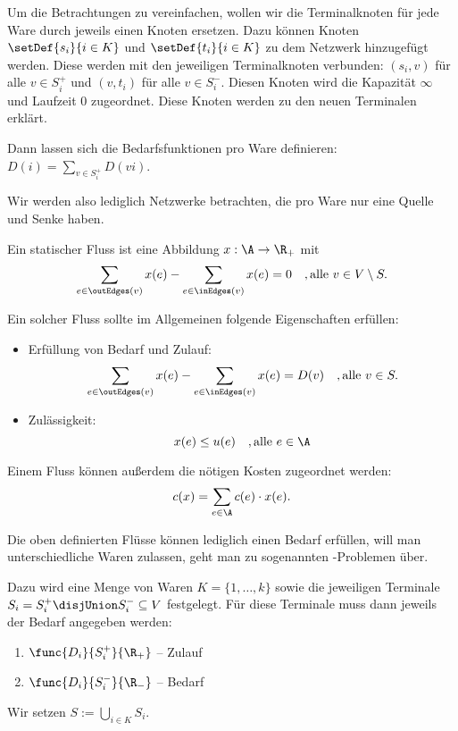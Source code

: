 \begin{remark}
    Um die Betrachtungen zu vereinfachen, wollen wir die Terminalknoten
    für jede Ware durch jeweils einen Knoten ersetzen. Dazu können
    Knoten $\setDef{s_i}{i \in K}$ und $\setDef{t_i}{i \in K}$ zu dem
    Netzwerk hinzugefügt werden. Diese werden mit den jeweiligen
    Terminalknoten verbunden: $(s_i, v)$ für alle $v \in S_i^+$ und
    $(v,t_i)$ für alle $v \in S_i^-$. Diesen Knoten wird die Kapazität $\infty$
    und Laufzeit $0$ zugeordnet. Diese Knoten werden zu den neuen Terminalen
    erklärt.

    Dann lassen sich die Bedarfsfunktionen pro Ware definieren:
    $D(i) = \sum_{v \in S_i^+} D(vi)$.

    Wir werden also lediglich Netzwerke betrachten, die pro Ware nur eine
    Quelle und Senke haben.

\end{remark}

\begin{definition}
    Ein statischer Fluss ist eine Abbildung $x : \A \rightarrow \R_+$ mit
    \[ \sum_{e \in \outEdges(v)} x(e) - \sum_{e \in \inEdges(v)} x(e) = 0
        \quad, \text{alle } v \in V \setminus S. \]

    Ein solcher Fluss sollte im Allgemeinen folgende Eigenschaften erfüllen:
    \begin{itemize}
        \item Erfüllung von Bedarf und Zulauf:
            \[ \sum_{e \in \outEdges(v)} x(e) - \sum_{e \in \inEdges(v)} x(e) = D(v)
                \quad, \text{alle } v \in S. \]
        \item Zulässigkeit:
            \[ x(e) \leq u(e) \quad, \text{alle } e \in \A \]
    \end{itemize}

    Einem Fluss können außerdem die nötigen Kosten zugeordnet werden:
        \[ c(x) = \sum_{e \in \A} c(e) \cdot x(e). \]
\end{definition}

\begin{definition}
    Die oben definierten Flüsse können lediglich einen Bedarf erfüllen, will
    man unterschiedliche Waren zulassen, geht man zu sogenannten
    -Problemen über.

    Dazu wird eine Menge von Waren $K = \{1, \ldots, k\}$ sowie die jeweiligen
    Terminale $S_i = S_i^+ \disjUnion S_i^- \subseteq V$ festgelegt. Für diese
    Terminale muss dann jeweils der Bedarf angegeben werden:
    \begin{enumerate}
        \item $\func{D_i}{S_i^+}{\R_+}$ -- Zulauf
        \item $\func{D_i}{S_i^-}{\R_-}$ -- Bedarf
    \end{enumerate}

    Wir setzen $S := \bigcup\limits_{i \in K} S_i$.
\end{definition}

